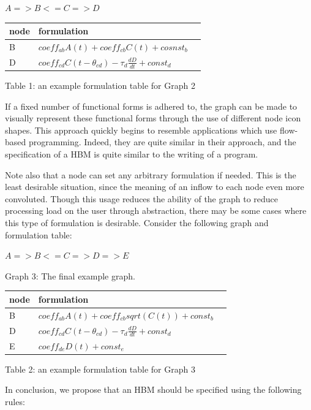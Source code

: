 \documentclass[conference]{IEEEtran}
\begin{document}
$A => B <= C => D$


\begin{centering}
\begin{tabular}{ | l | l | l |}
    \hline
    node & formulation \\ \hline
    B & $coeff_{ab}A(t) + coeff_{cb}C(t) + cosnst_b$  \\ \hline
    D & $coeff_{cd}C(t-\theta_{cd}) - \tau_{d}\frac{dD}{dt} + const_d$ \\ \hline
\end{tabular}
Table 1: an example formulation table for Graph 2 
\end{centering}


If a fixed number of functional forms is adhered to, the graph can be made to visually represent these functional forms through the use of different node icon shapes. 
This approach quickly begins to resemble applications which use flow-based programming. 
Indeed, they are quite similar in their approach, and the specification of a HBM is quite similar to the writing of a program.

Note also that a node can set any arbitrary formulation if needed. 
This is the least desirable situation, since the meaning of an inflow to each node even more convoluted. 
Though this usage reduces the ability of the graph to reduce processing load on the user through abstraction, there may be some cases where this type of formulation is desirable. 
Consider the following graph and formulation table:

$A => B <= C => D => E$

Graph 3: The final example graph.

\begin{centering}
\begin{tabular}{ | l | l | l |}
    \hline
    node & formulation \\ \hline
    B & $coeff_{ab}A(t) + coeff_{cb}sqrt(C(t)) + const_b$ \\ \hline
    D & $coeff_{cd}C(t-\theta_{cd}) - \tau_{d}\frac{dD}{dt} + const_{d}$ \\ \hline
    E & $coeff_{de}D(t) + const_{e}$ \\ \hline
\end{tabular}
Table 2: an example formulation table for Graph 3
\end{centering}

In conclusion, we propose that an HBM should be specified using the following rules:
\end{document}

